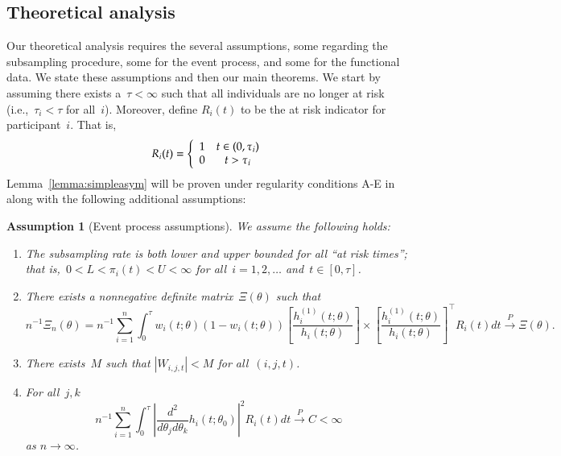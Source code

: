 \documentclass[12pt]{amsart}
\newtheorem{assumption}[thm]{Assumption}
\begin{document}
\subsection{Theoretical analysis}

Our theoretical analysis requires the several
assumptions, some regarding the subsampling procedure, some for the
event process, and some for the functional data. We state these
assumptions and then our main theorems.  
We start by assuming there exists a~$\tau < \infty$ such that all
individuals are no longer at risk (i.e.,~$\tau_i < \tau$ for all~$i$).
Moreover, define $R_i (t)$ to be the at risk indicator for
participant~$i$.  That is,   
\[
R_i (t) = \left \{ \begin{array}{c c} 1 & t \in (0,\tau_i) \\ 0
                                        & t > \tau_i\end{array} \right .
\]
Lemma~\ref{lemma:simpleasym} will be proven under regularity
conditions A-E in~\cite[pp. 420--421]{Andersen1993} along with the
following additional assumptions:

\begin{assumption}[Event process assumptions] 
\label{assumption:events}\normalfont
We assume the following holds:
\begin{enumerate}[label=(E.\arabic*)]
\item\label{E1} The subsampling rate is both lower and upper
  bounded for all ``at risk times''; that is,~$0 < L < \pi_i (t) < U <
  \infty$ for all~$i=1,2,\ldots$ and~$t \in [0,\tau]$. 
\item\label{E2} There exists a nonnegative definite matrix~$\Xi
  (\theta)$ such that
  \[
    n^{-1} \Xi_n (\theta) = n^{-1} \sum_{i=1}^n \int_0^\tau w_i (t;
    \theta) (1 - w_i (t; \theta)) \left[ \frac{h_i^{(1)}(t;
        \theta)}{h_i (t; \theta)} \right] \times  \left [
      \frac{h_i^{(1)} (t;\theta)}{h_i(t; \theta)} \right]^\top R_i (t)
    dt \overset{P}{\to} \Xi (\theta).
  \] 
\item\label{E3} There exists~$M$ such that $|W_{i,j,t}| < M$ for
  all~$(i,j,t)$.
\item\label{E4} For all~$j,k$ 
\[
n^{-1} \sum_{i=1}^n \int_0^\tau \left | \frac{d^2}{d\theta_j
    d\theta_k} h_i (t;\theta_0) \right|^2 R_i (t) dt \overset{P}{\to}
C < \infty
\]
as $n \to \infty$.
\end{enumerate}
\end{assumption}
\end{document}
